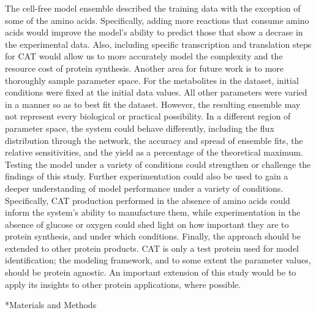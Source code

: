 \documentclass[12pt]{article}
\makeatletter
\renewcommand\section{\@startsection
	{subsection}{2}{0mm}
	{-0.2in}
	{0.05\baselineskip}
	{\normalfont\large\bfseries}}
\makeatother
\begin{document}
The cell-free model ensemble described the training data with the exception of some of the amino acids.
Specifically, adding more reactions that consume amino acids would improve the model's ability to predict those that show a decrase in the experimental data.
Also, including specific transcription and translation steps for CAT would allow us to more accurately model the complexity and the resource cost of protein synthesis.
Another area for future work is to more thoroughly sample parameter space.
For the metabolites in the dataset, initial conditions were fixed at the initial data values.
All other parameters were varied in a manner so as to best fit the dataset.
However, the resulting ensemble may not represent every biological or practical possibility.
In a different region of parameter space, the system could behave differently, including the flux distribution through the network, the accuracy and spread of ensemble fits, the relative sensitivities, and the yield as a percentage of the theoretical maximum.
Testing the model under a variety of conditions could strengthen or challenge the findings of this study.
Further experimentation could also be used to gain a deeper understanding of model performance under a variety of conditions.
Specifically, CAT production performed in the absence of amino acids could inform the system's ability to manufacture them, while experimentation in the absence of glucose or oxygen could shed light on how important they are to protein synthesis, and under which conditions.
Finally, the approach should be extended to other protein products.
CAT is only a test protein used for model identification; the modeling framework, and to some extent the parameter values, should be protein agnostic.
An important extension of this study would be to apply its insights to other protein applications, where possible.

\clearpage

\section*{Materials and Methods}
\end{document}
